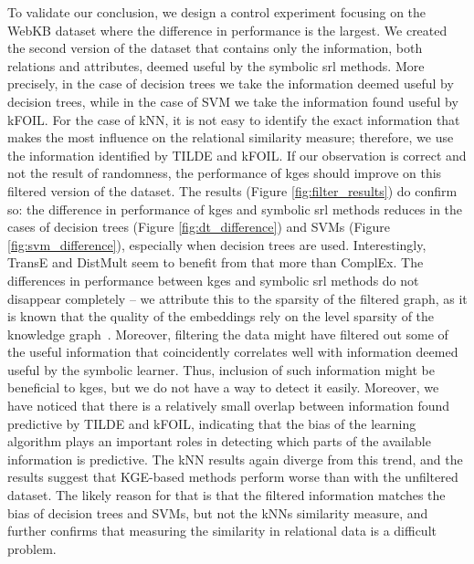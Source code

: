 To validate our conclusion, we design a control experiment focusing on the WebKB dataset where the difference in performance is the largest.
We created the second version of the dataset that contains only the information, both relations and attributes, deemed useful by the symbolic \gls{srl} methods.
More precisely, in the case of decision trees we take the information deemed useful by decision trees, while in the case of SVM we take the information found useful by kFOIL.
For the case of kNN, it is not easy to identify the exact information that makes the most influence on the relational similarity measure; therefore, we use the information identified by TILDE and kFOIL.
If our observation is correct and not the result of randomness, the performance of \gls{kge}s should improve on this filtered version of the dataset.
The results (Figure \ref{fig:filter_results}) do confirm so: the difference in performance of \gls{kge}s and symbolic \gls{srl} methods reduces in the cases of decision trees (Figure \ref{fig:dt_difference}) and SVMs (Figure \ref{fig:svm_difference}), especially when decision trees are used.
Interestingly, TransE and DistMult seem to benefit from that more than ComplEx.
The differences in performance between \gls{kge}s and symbolic \gls{srl} methods do not disappear completely -- we attribute this to the sparsity of the filtered graph, as it is known that the quality of the embeddings rely on the level sparsity of the knowledge graph~\cite{pujara:emnlp17}.
Moreover, filtering the data might have filtered out some of the useful information that coincidently correlates well with information deemed useful by the symbolic learner.
Thus, inclusion of such information might be beneficial to \gls{kge}s, but we do not have a way to detect it easily.
Moreover, we have noticed that there is a relatively small overlap between information found predictive by TILDE and kFOIL, indicating that the bias of the learning algorithm plays an important roles in detecting which parts of the available information is predictive.
The kNN results again diverge from this trend, and the results suggest that KGE-based methods perform worse than with the unfiltered dataset.
The likely reason for that is that the filtered information matches the bias of decision trees and SVMs, but not the kNNs similarity measure, and further confirms that measuring the similarity in relational data is a difficult problem.



